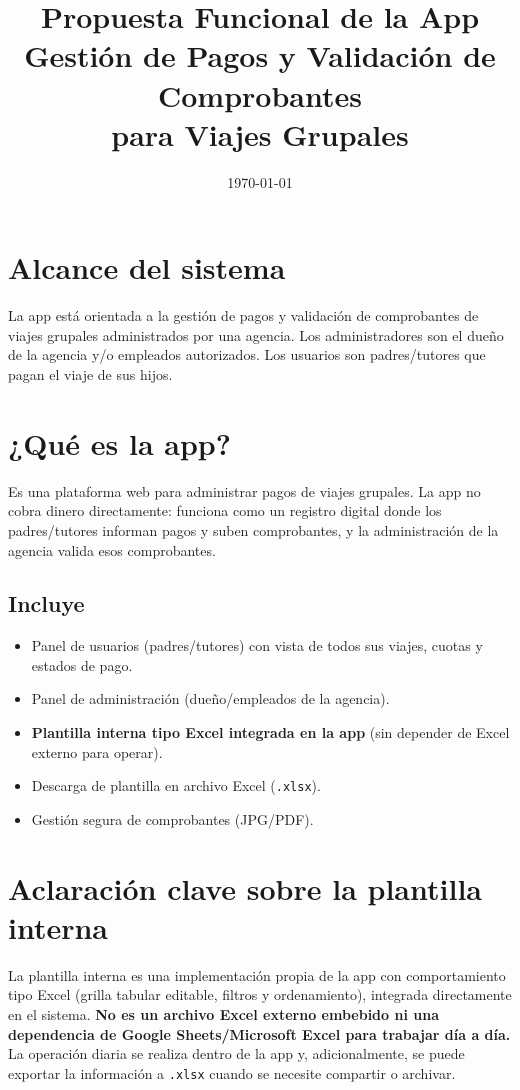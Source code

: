 \documentclass[12pt,a4paper]{article}
\title{Propuesta Funcional de la App \\ Gestión de Pagos y Validación de Comprobantes \\ para Viajes Grupales}
\author{}
\date{\today}
\begin{document}
\maketitle

\section{Alcance del sistema}
La app está orientada a la gestión de pagos y validación de comprobantes de viajes grupales administrados por una agencia.
Los administradores son el dueño de la agencia y/o empleados autorizados.
Los usuarios son padres/tutores que pagan el viaje de sus hijos.

\section{¿Qué es la app?}
Es una plataforma web para administrar pagos de viajes grupales.
La app no cobra dinero directamente: funciona como un registro digital donde los padres/tutores informan pagos y suben comprobantes, y la administración de la agencia valida esos comprobantes.

\subsection*{Incluye}
\begin{itemize}[leftmargin=*]
    \item Panel de usuarios (padres/tutores) con vista de todos sus viajes, cuotas y estados de pago.
    \item Panel de administración (dueño/empleados de la agencia).
    \item \textbf{Plantilla interna tipo Excel integrada en la app} (sin depender de Excel externo para operar).
    \item Descarga de plantilla en archivo Excel (\texttt{.xlsx}).
    \item Gestión segura de comprobantes (JPG/PDF).
\end{itemize}

\section{Aclaración clave sobre la plantilla interna}
La plantilla interna es una implementación propia de la app con comportamiento tipo Excel (grilla tabular editable, filtros y ordenamiento), integrada directamente en el sistema.
\textbf{No es un archivo Excel externo embebido ni una dependencia de Google Sheets/Microsoft Excel para trabajar día a día.}
La operación diaria se realiza dentro de la app y, adicionalmente, se puede exportar la información a \texttt{.xlsx} cuando se necesite compartir o archivar.
\end{document}
